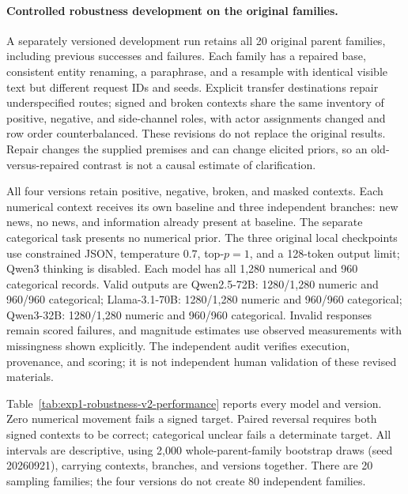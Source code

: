 \paragraph{Controlled robustness development on the original families.}
A separately versioned development run retains all 20 original parent families,
including previous successes and failures. Each family has a repaired base,
consistent entity renaming, a paraphrase, and a resample with identical visible
text but different request IDs and seeds. Explicit transfer destinations repair
underspecified routes; signed and broken contexts share the same inventory of
positive, negative, and side-channel roles, with actor assignments changed and
row order counterbalanced. These revisions do not replace the original results.
Repair changes the supplied premises and can change elicited priors, so an
old-versus-repaired contrast is not a causal estimate of clarification.

All four versions retain positive, negative, broken, and masked contexts.
Each numerical context receives its own baseline and three independent branches:
new news, no news, and information already present at baseline. The separate
categorical task presents no numerical prior. The three original local
checkpoints use constrained JSON, temperature $0.7$, top-$p=1$, and a 128-token
output limit; Qwen3 thinking is disabled. Each model has all 1,280 numerical and
960 categorical records. Valid outputs are Qwen2.5-72B: 1280/1,280 numeric and 960/960 categorical; Llama-3.1-70B: 1280/1,280 numeric and 960/960 categorical; Qwen3-32B: 1280/1,280 numeric and 960/960 categorical.
Invalid responses remain scored failures, and magnitude estimates use observed
measurements with missingness shown explicitly. The independent audit verifies
execution, provenance, and scoring; it is not independent human validation of
these revised materials.

Table~\ref{tab:exp1-robustness-v2-performance} reports every model and version.
Zero numerical movement fails a signed target. Paired reversal requires both
signed contexts to be correct; categorical unclear fails a determinate target.
All intervals are descriptive, using 2,000 whole-parent-family bootstrap draws
(seed 20260921), carrying contexts, branches, and versions together. There are
20 sampling families; the four versions do not create 80 independent families.

\begin{center}
\begin{minipage}{\linewidth}
\centering
{}
\label{tab:exp1-robustness-v2-performance}
\small
\resizebox{\linewidth}{!}{}
\end{minipage}
\end{center}

